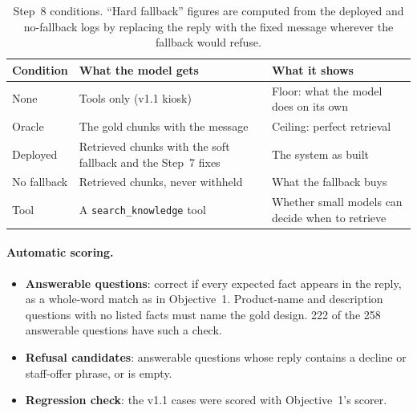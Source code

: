 \documentclass[11pt,a4paper]{article}
\begin{document}
\begin{table}[H]
\centering
\small
\begin{tabularx}{\textwidth}{l L L}
\toprule
Condition & What the model gets & What it shows \\
\midrule
None & Tools only (v1.1 kiosk) & Floor: what the model does on its own \\
Oracle & The gold chunks with the message & Ceiling: perfect retrieval \\
Deployed & Retrieved chunks with the soft fallback and the Step~7 fixes & The system as built \\
No fallback & Retrieved chunks, never withheld & What the fallback buys \\
Tool & A \texttt{search\_knowledge} tool & Whether small models can decide when to retrieve \\
\bottomrule
\end{tabularx}
\caption{Step~8 conditions. ``Hard fallback'' figures are computed from the deployed and no-fallback logs by replacing
the reply with the fixed message wherever the fallback would refuse.}
\label{tab:conditions}
\end{table}

\paragraph{Automatic scoring.}
\begin{itemize}
  \item \textbf{Answerable questions}: correct if every expected fact appears in the reply, as a whole-word match as in
        Objective~1. Product-name and description questions with no listed facts must name the gold design. 222 of the
        258 answerable questions have such a check.
  \item \textbf{Refusal candidates}: answerable questions whose reply contains a decline or staff-offer phrase, or is
        empty.
  \item \textbf{Regression check}: the v1.1 cases were scored with Objective~1's scorer.
\end{itemize}
\end{document}

